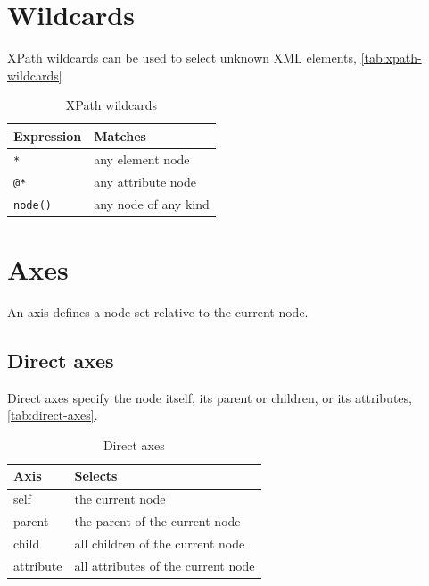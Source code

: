 \documentclass{pgnotes}
\begin{document}
\section{Wildcards}

XPath wildcards can be used to select unknown XML elements, \autoref{tab:xpath-wildcards}

\begin{table}[htbp]
  \centering
  \begin{tabular}{l l}
    \toprule
    \textbf{Expression} & \textbf{Matches} \\
    \midrule
    \texttt{*} &  any element node \\
    \texttt{@*} &  any attribute node \\
    \texttt{node()} & any node of any kind \\
    \bottomrule
  \end{tabular}
  \caption{XPath wildcards}
  \label{tab:xpath-wildcards}
\end{table}





\section{Axes}

An axis defines a node-set relative to the current node.

\subsection{Direct axes}

Direct axes specify the node itself, its parent or children, or its attributes, \autoref{tab:direct-axes}. 

\begin{table}[htbp]
  \begin{tabularx}{1.0\linewidth}{l X}
    \toprule
    \textbf{Axis} & \textbf{Selects} \\
    \midrule
    self & the current node \\
    parent & the parent of the current node \\
    child & all children of the current node \\
    attribute & all attributes of the current node \\
    \bottomrule
  \end{tabularx}
  \caption{Direct axes}
  \label{tab:direct-axes}
\end{table}
\end{document}
